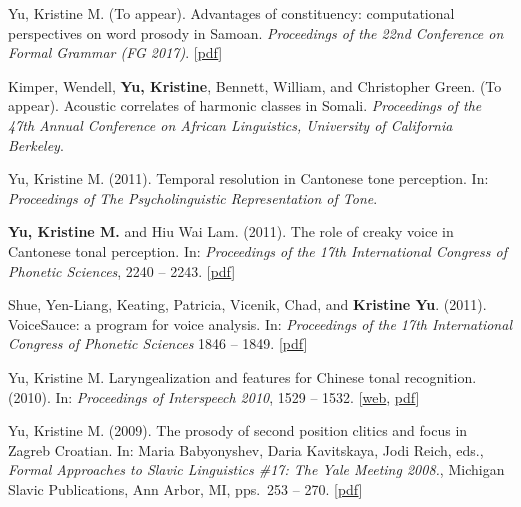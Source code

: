 \documentclass[10pt]{article}
\begin{document}
\begin{bibenum}
  
\item Yu, Kristine M. (To appear). Advantages of constituency: computational perspectives on word prosody in Samoan. \emph{Proceedings of the 22nd Conference on Formal Grammar (FG 2017)}. [\href{https://github.com/krismyu/smo-constituency-feet/blob/master/fg-kmyu.pdf}{pdf}]

  \item Kimper, Wendell, \textbf{Yu, Kristine}, Bennett, William, and Christopher Green. (To appear). Acoustic correlates of harmonic classes in
    Somali. \emph{Proceedings of the 47th Annual Conference on African Linguistics, University of California Berkeley}.
  
    \item Yu, Kristine M. (2011). Temporal resolution in {C}antonese tone
      perception. In: \emph{Proceedings of The Psycholinguistic Representation of Tone}.

    \item \textbf{Yu, Kristine M.} and Hiu Wai Lam. (2011). The role of creaky
      voice in {C}antonese tonal perception. In: \emph{Proceedings of the
        17th International Congress of Phonetic Sciences},
      2240 -- 2243. [\href{http://www.krisyu.org/pages/pdfs/yu-lam2011-icphs-cantonese-creak.pdf}{pdf}] 

    \item Shue, Yen-Liang, Keating, Patricia, Vicenik, Chad, and \textbf{Kristine
      Yu}. (2011). VoiceSauce: a program for voice analysis. In:
      \emph{Proceedings of the 17th International Congress of Phonetic
        Sciences}
      1846 -- 1849. [\href{http://www.krisyu.org/pages/pdfs/shueETAL2011-icphsxvii-voicesauce.pdf}{pdf}]

    \item Yu, Kristine M. Laryngealization and features for Chinese
      tonal recognition. (2010). In: \emph{Proceedings of Interspeech 2010},
      1529 --
      1532. [\href{http://www.isca-speech.org/archive/interspeech_2010/i10_1529.html}{web}, \href{http://www.krisyu.org/pages/pdfs/yu2010-interspeech-laryngealization.pdf}{pdf}]

    \item Yu, Kristine M. (2009). The prosody of second position
      clitics and focus in Zagreb Croatian. In: Maria Babyonyshev,
      Daria Kavitskaya, Jodi Reich, eds., \emph{Formal Approaches to Slavic Linguistics \#17: 
The Yale Meeting 2008.}, Michigan Slavic Publications, Ann Arbor, MI,
pps.\ 253 -- 270. [\href{http://www.krisyu.org/pages/pdfs/yu2009-fasl17-croatian-2pc.pdf}{pdf}]  

\end{bibenum}
\end{document}
